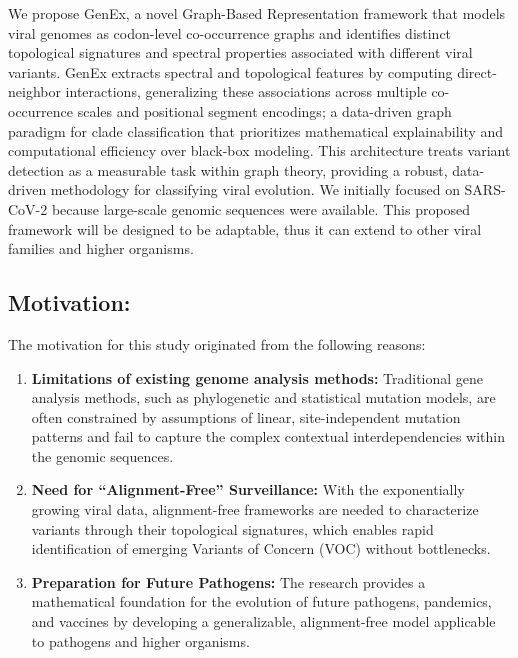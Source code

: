 \documentclass[conference]{IEEEtran}
\begin{document}
We propose GenEx, a novel Graph-Based Representation framework that models viral genomes as codon-level co-occurrence graphs and identifies distinct topological signatures and spectral properties associated with different viral variants. GenEx extracts spectral and topological features by computing direct-neighbor interactions, generalizing these associations across multiple co-occurrence scales and positional segment encodings; a data-driven graph paradigm for clade classification that prioritizes mathematical explainability and computational efficiency over black-box modeling. This architecture treats variant detection as a measurable task within graph theory, providing a robust, data-driven methodology for classifying viral evolution. We initially focused on SARS-CoV-2 because large-scale genomic sequences were available. This proposed framework will be designed to be adaptable, thus it can extend to other viral families and higher organisms. 


\subsection{Motivation:}
The motivation for this study originated from the following reasons:
\begin{enumerate}
    \item \textbf{Limitations of existing genome analysis methods:}
    Traditional gene analysis methods, such as phylogenetic and statistical mutation models, are often constrained by assumptions of linear, site-independent mutation patterns and fail to capture the complex contextual interdependencies within the genomic sequences.
    \item \textbf{Need for ``Alignment-Free'' Surveillance:}
    With the exponentially growing viral data, alignment-free frameworks are needed to characterize variants through their topological signatures, which enables rapid identification of emerging Variants of Concern (VOC) without bottlenecks.
    \item \textbf{Preparation for Future Pathogens: }
    The research provides a mathematical foundation for the evolution of future pathogens, pandemics, and vaccines by developing a generalizable, alignment-free model applicable to pathogens and higher organisms.
\end{enumerate}
\end{document}
